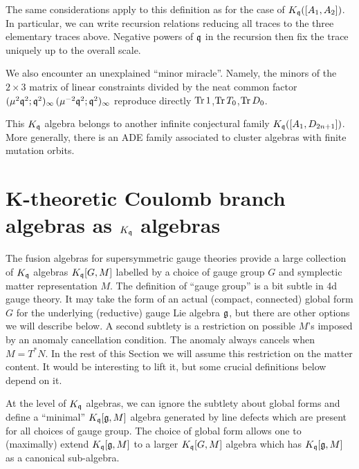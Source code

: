 \documentclass[12pt]{amsart}
\begin{document}
\begin{remark} The same considerations apply to this definition as for the case of $K_{\mathfrak{q}}([A_1,A_2])$. In particular, we can write recursion relations reducing all traces to the three elementary traces above. Negative powers of $\mathfrak{q}$ in the recursion then fix the trace uniquely up to the overall scale. \end{remark}

\begin{remark}
\label{rem:a1d3-miracle}
We also encounter an unexplained ``minor miracle''. Namely, the minors of the $2 \times 3$ matrix of linear constraints 
divided by the neat common factor $(\mu^2\mathfrak{q}^2;\mathfrak{q}^2)_\infty\,(\mu^{-2}\mathfrak{q}^2;\mathfrak{q}^2)_\infty$ reproduce directly
$\operatorname{Tr} 1$,$\operatorname{Tr} T_0$,$\operatorname{Tr} D_0$. 
\end{remark}

This $K_{\mathfrak{q}}$ algebra belongs to another infinite conjectural family $K_{\mathfrak{q}}([A_1,D_{2n+1}])$. More generally, 
there is an ADE family associated to cluster algebras with finite mutation orbits.
 
\section{K-theoretic Coulomb branch algebras as $K_{\mathfrak{q}}$ algebras}
\label{sec:coulomb}
The fusion algebras for supersymmetric gauge theories provide a large collection of $K_{\mathfrak{q}}$ algebras $K_{\mathfrak{q}}[G,M]$ labelled by a choice of gauge group $G$ and symplectic matter representation $M$. The definition of ``gauge group'' is a bit subtle in 4d gauge theory. It may take the form of an actual (compact, connected) global form $G$ for the underlying (reductive) gauge Lie algebra $\mathfrak{g}$, but there are other options we will describe below. A second subtlety is a restriction on possible $M$'s imposed by an anomaly cancellation condition. The anomaly always cancels when $M=T^*N$. In the rest of this Section we will assume this restriction on the matter content. It would be interesting to lift it, but some crucial definitions below depend on it. 

At the level of $K_{\mathfrak{q}}$ algebras, we can ignore the subtlety about global forms and define a ``minimal'' $K_{\mathfrak{q}}[\mathfrak{g},M]$ algebra generated by line defects which are present for all choices of gauge group. The choice of global form allows one to (maximally) extend $K_{\mathfrak{q}}[\mathfrak{g},M]$ to a larger $K_{\mathfrak{q}}[G,M]$ algebra which has $K_{\mathfrak{q}}[\mathfrak{g},M]$ as a canonical sub-algebra. 
\end{document}
